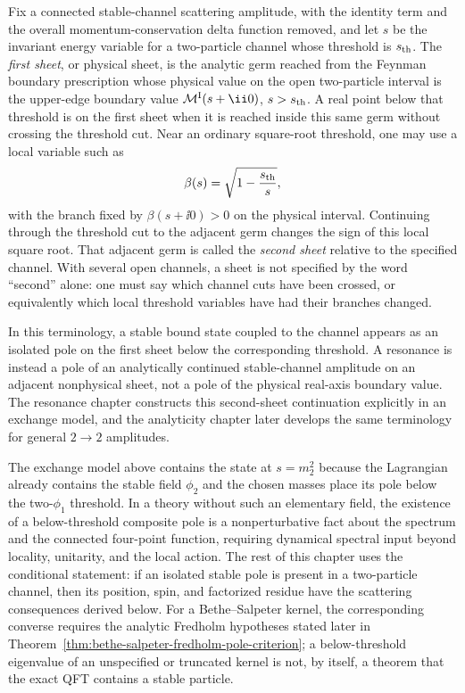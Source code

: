 \begin{definition}
\label{def:stable-channel-sheet-convention}
Fix a connected stable-channel scattering amplitude, with the identity term
and the overall momentum-conservation delta function removed, and let \(s\)
be the invariant energy variable for a two-particle channel whose threshold is
\(s_{\rm th}\).  The \emph{first sheet}, or physical sheet, is the analytic
germ reached from the Feynman boundary prescription whose physical value on
the open two-particle interval is the upper-edge boundary value
\(\mathcal M^{\rm I}(s+\ii0)\), \(s>s_{\rm th}\).  A real point below that
threshold is on the first sheet when it is reached inside this same germ
without crossing the threshold cut.  Near an ordinary square-root threshold,
one may use a local variable such as
\[
  \beta(s)=\sqrt{1-\frac{s_{\rm th}}{s}},
\]
with the branch fixed by \(\beta(s+\ii0)>0\) on the physical interval.
Continuing through the threshold cut to the adjacent germ changes the sign of
this local square root.  That adjacent germ is called the \emph{second sheet}
relative to the specified channel.  With several open channels, a sheet is not
specified by the word ``second'' alone: one must say which channel cuts have
been crossed, or equivalently which local threshold variables have had their
branches changed.

In this terminology, a stable bound state coupled to the channel appears as an
isolated pole on the first sheet below the corresponding threshold.  A
resonance is instead a pole of an analytically continued stable-channel
amplitude on an adjacent nonphysical sheet, not a pole of the physical
real-axis boundary value.  The resonance chapter constructs this second-sheet
continuation explicitly in an exchange model, and the analyticity chapter
later develops the same terminology for general \(2\to2\) amplitudes.
\end{definition}

\begin{remark}
The exchange model above contains the state at \(s=m_2^2\) because the
Lagrangian already contains the stable field \(\phi_2\) and the chosen masses
place its pole below the two-\(\phi_1\) threshold.  In a theory without such an
elementary field, the existence of a below-threshold composite pole is a
nonperturbative fact about the spectrum and the connected four-point function,
requiring dynamical spectral input beyond locality, unitarity, and the local
action.  The rest of this chapter uses the conditional statement: if an isolated
stable pole is present in a two-particle channel, then its position, spin, and
factorized residue have the scattering consequences derived below.
For a Bethe--Salpeter kernel, the corresponding converse requires the analytic
Fredholm hypotheses stated later in
Theorem~\ref{thm:bethe-salpeter-fredholm-pole-criterion}; a below-threshold
eigenvalue of an unspecified or truncated kernel is not, by itself, a theorem
that the exact QFT contains a stable particle.
\end{remark}

